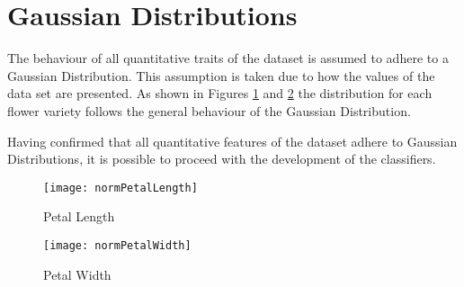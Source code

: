 \section{Gaussian Distributions}

The behaviour of all quantitative traits of the dataset is assumed to adhere to a
Gaussian Distribution.
This assumption is taken due to how the values of the data set are presented.
As shown in Figures
\ref{fig: petal length normal distribution} and
\ref{fig: petal width normal distribution}
the distribution for each flower variety follows the
general behaviour of the Gaussian Distribution.

Having confirmed that all quantitative features of the dataset
adhere to Gaussian Distributions, it is possible to proceed with the
development of the classifiers.

%

\begin{figure}[htb!]
 \texttt{[image: normPetalLength]}
 \caption{Petal Length}
 \label{fig: petal length normal distribution}
\end{figure}

\begin{figure}[htb!]
 \texttt{[image: normPetalWidth]}
 \caption{Petal Width}
 \label{fig: petal width normal distribution}
\end{figure}



\pagebreak
\newpage
